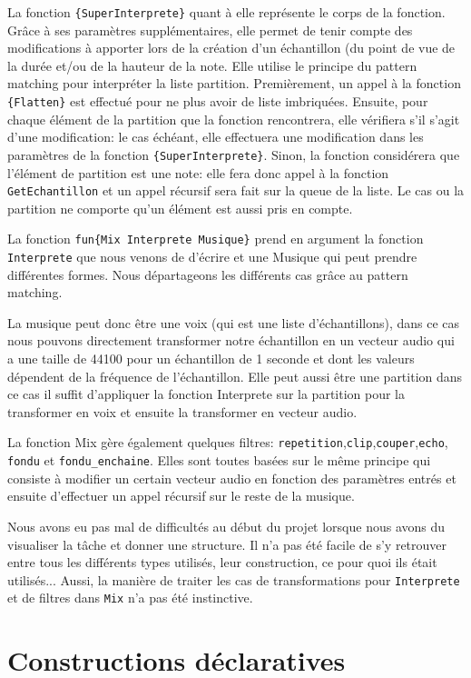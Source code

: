 \documentclass[a4paper,12pt,oneside ]{article}
\begin{document}
	La fonction \texttt{\{SuperInterprete\}} quant à elle représente le corps de la fonction. Grâce à ses paramètres supplémentaires, elle permet de tenir compte des modifications à apporter lors de la création d'un échantillon (du point de vue de la durée et/ou de la hauteur de la note. Elle utilise le principe du pattern matching pour interpréter la liste partition. Premièrement, un appel à la fonction \texttt{\{Flatten\}} est effectué pour ne plus avoir de liste imbriquées. Ensuite, pour chaque élément de la partition que la fonction rencontrera, elle vérifiera s'il s'agit d'une modification: le cas échéant, elle effectuera une modification dans les paramètres de la fonction \texttt{\{SuperInterprete\}}. Sinon, la fonction considérera que l'élément de partition est une note: elle fera donc appel à la fonction \texttt{GetEchantillon} et un appel récursif sera fait sur la queue de la liste. Le cas ou la partition ne comporte qu'un élément est aussi pris en compte.
	
	La fonction \texttt{fun\{Mix Interprete Musique\}} prend en argument la fonction \texttt{Interprete} que nous venons de d'écrire et une Musique qui peut prendre différentes formes. Nous départageons les différents cas grâce au pattern matching.
	
	La musique peut donc être une voix (qui est une liste d'échantillons), dans ce cas nous pouvons directement transformer notre échantillon en un vecteur audio qui a une taille de 44100 pour un échantillon de 1 seconde et dont les valeurs dépendent de la fréquence de l'échantillon. Elle peut aussi être une partition dans ce cas il suffit d'appliquer la fonction Interprete sur la partition pour la transformer en voix et ensuite la transformer en vecteur audio. 
	
	La fonction Mix gère également quelques filtres: \texttt{repetition},\texttt{clip},\texttt{couper},\texttt{echo}, \texttt{fondu} et \texttt{fondu\_enchaine}. Elles sont toutes basées sur le même principe qui consiste à modifier un certain vecteur audio en fonction des paramètres entrés et ensuite d'effectuer un appel récursif sur le reste de la musique.
	
	Nous avons eu pas mal de difficultés au début du projet lorsque nous avons du visualiser la tâche et donner une structure. Il n'a pas été facile de s'y retrouver entre tous les différents types utilisés, leur construction, ce pour quoi ils était utilisés... Aussi, la manière de traiter les cas de transformations pour \texttt{Interprete} et de filtres dans \texttt{Mix} n'a pas été instinctive.
	
\section{Constructions déclaratives}
\end{document}
